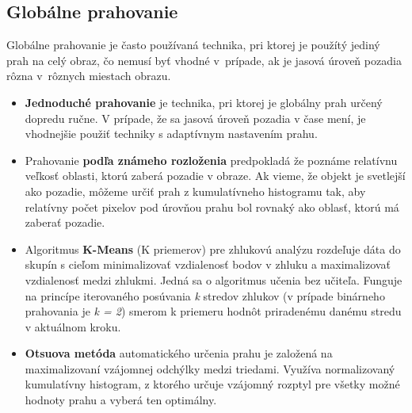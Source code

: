 \subsection{Globálne prahovanie}

    Globálne prahovanie je často používaná technika, pri ktorej je použítý jediný prah na celý obraz, čo nemusí byť vhodné v~prípade, ak je jasová úroveň pozadia rôzna v~rôznych miestach obrazu. \cite{Morse1998/1}

    \begin{itemize}
        \item \textbf{Jednoduché prahovanie} je technika, pri ktorej je globálny prah určený dopredu ručne. V prípade, že sa jasová úroveň pozadia v čase mení, je vhodnejšie použiť techniky s adaptívnym nastavením prahu.

        \item Prahovanie \textbf{podľa známeho rozloženia} predpokladá že poznáme relatívnu veľkosť oblasti, ktorú zaberá pozadie v obraze. Ak vieme, že objekt je svetlejší ako pozadie, môžeme určiť prah z kumulatívneho histogramu tak, aby relatívny počet pixelov pod úrovňou prahu bol rovnaký ako oblasť, ktorú má zaberať pozadie.

        \item Algoritmus \textbf{K-Means} (K priemerov) pre zhlukovú analýzu rozdeľuje dáta do skupín s cieľom minimalizovať vzdialenosť bodov v zhluku a maximalizovať vzdialenosť medzi zhlukmi. Jedná sa o algoritmus učenia bez učiteľa. Funguje na princípe iterovaného posúvania \emph{k} stredov zhlukov (v prípade binárneho prahovania je \emph{k = 2}) smerom k priemeru hodnôt priradenému danému stredu v aktuálnom kroku.

        \item \textbf{Otsuova metóda} automatického určenia prahu je založená na maximalizovaní vzájomnej odchýlky medzi triedami. Využíva normalizovaný kumulatívny histogram, z ktorého určuje vzájomný rozptyl pre všetky možné hodnoty prahu a vyberá ten optimálny.
    \end{itemize}

